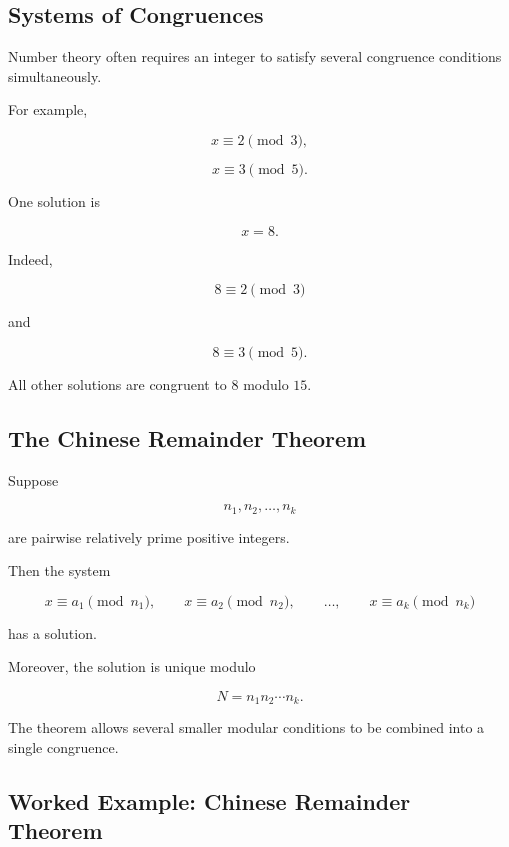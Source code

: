 \subsection{Systems of Congruences}
\label{subsec:systems-congruences}

Number theory often requires an integer to satisfy several congruence
conditions simultaneously.

For example,

\[ x\equiv2\pmod3, \]

\[ x\equiv3\pmod5. \]

One solution is

\[ x=8. \]

Indeed,

\[ 8\equiv2\pmod3 \]

and

\[ 8\equiv3\pmod5. \]

All other solutions are congruent to \(8\) modulo \(15\).

\subsection{The Chinese Remainder Theorem}
\label{subsec:chinese-remainder-theorem}

\begin{theorem}
Suppose

\[ n_1,n_2,\ldots,n_k \]

are pairwise relatively prime positive integers.

Then the system

\[
x\equiv a_1\pmod{n_1},\qquad
x\equiv a_2\pmod{n_2},\qquad
\ldots,\qquad
x\equiv a_k\pmod{n_k}
\]

has a solution.

Moreover, the solution is unique modulo

\[ N=n_1n_2\cdots n_k. \]
\end{theorem}

The theorem allows several smaller modular conditions to be combined into a
single congruence.

\subsection{Worked Example: Chinese Remainder Theorem}
\label{subsec:worked-crt}


